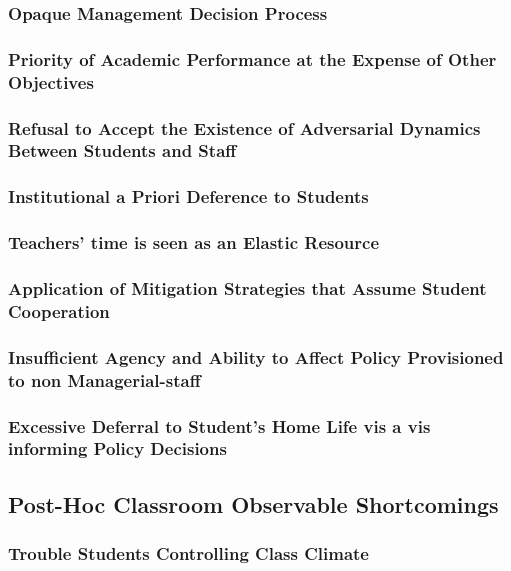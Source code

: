 \documentclass[12pt]{article}
\begin{document}
	\subsubsection{Opaque Management Decision Process}
	\subsubsection{Priority of Academic Performance at the Expense of Other Objectives}
	\subsubsection{Refusal to Accept the Existence of Adversarial Dynamics Between Students and Staff}
	\subsubsection{Institutional a Priori Deference to Students}
	\subsubsection{Teachers' time is seen as an Elastic Resource}
	\subsubsection{Application of Mitigation Strategies that Assume Student Cooperation}
	\subsubsection{Insufficient Agency and Ability to Affect Policy Provisioned to non Managerial-staff}
	\subsubsection{Excessive Deferral to Student's Home Life vis a vis informing Policy Decisions}

	\subsection{Post-Hoc Classroom Observable Shortcomings}
	\subsubsection{Trouble Students Controlling Class Climate}
\end{document}

